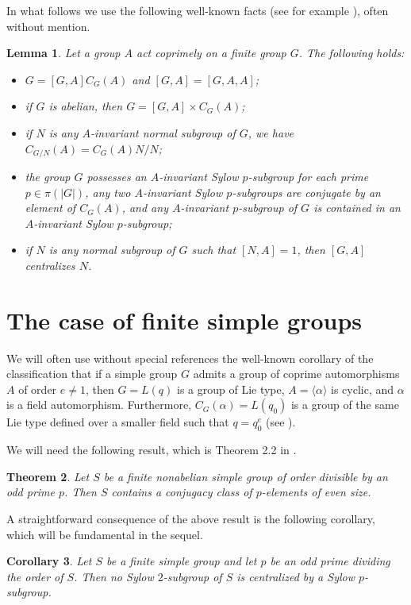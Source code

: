 \documentclass[12pt]{amsart}
\newtheorem{theorem}{\bf Theorem}[section]
\newtheorem{lemma}[theorem]{\bf Lemma}
\newtheorem{corollary}[theorem]{\bf Corollary}
\newcommand{\al }{\alpha }
\begin{document}
In what follows we use the following well-known facts (see for example \cite{asch}), often without mention. 
\begin{lemma}\label{coprime}
Let a group $A$ act coprimely on a finite group $G$. The following  holds:
\begin{itemize}
    \item[(i)] $G = [G, A]C_G(A)$ and $[G,A]=[G,A,A]$;\
		\item[(ii)] if $G$ is abelian, then $G = [G,A]\times C_G(A)$;
    \item[(iii)] if $N$ is any $A$-invariant normal subgroup of $G$, we have $C_{G/N}(A) = C_G(A)N/N$;
		\item[(iv)] the group $G$ possesses an $A$-invariant Sylow $p$-subgroup for each prime $p \in \pi(|G|)$,  any two $A$-invariant Sylow $p$-subgroups are conjugate by an element of $C_G(A)$, and any  $A$-invariant  $p$-subgroup of $G$ is contained in an $A$-invariant Sylow $p$-subgroup;
		\item[(v)] if $N$ is any normal subgroup of $G$ such that $[N,A]=1$, then $[G,A]$ centralizes $N$.
    \end{itemize}
\end{lemma}

\section{The case of finite simple groups}
 We will often use without special references the well-known corollary of the classification that if a simple group $G$ admits a group of coprime automorphisms $A$ of order $e\ne1$, then $G = L(q)$ is a group of Lie type, $A=\langle\al\rangle$ is cyclic, and $\alpha$ is a field automorphism. Furthermore, $C_G(\alpha) = L(q_0)$ is a group of the same Lie type defined over a smaller field such that $q = q_0^e$ (see \cite{GLS3}).

We will need the following result, which is Theorem 2.2 in \cite{BFMMNSST}.

\begin{theorem} Let $S$ be a finite nonabelian simple group of order divisible by an
odd prime $p$. Then $S$ contains a conjugacy class of $p$-elements of even size.\end{theorem}

A straightforward consequence of the above result is the following corollary, which will be fundamental in the sequel.

\begin{corollary}\label{cor-simple-p-q}  Let $S$ be a finite simple group and let $p$ be an odd prime dividing the order of $S$. Then no Sylow $2$-subgroup of $S$ is centralized by a Sylow $p$-subgroup.
\end{corollary}
\end{document}
